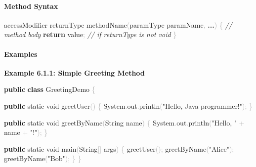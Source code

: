 \documentclass[
  justified,
  openright,
]{tufte-book}
\let\subsection\paragraph
\let\paragraph\paragraph
\newcommand{\KeywordTok}[1]{\textcolor{CodeKeyword}{\textbf{#1}}}  %
\newcommand{\StringTok}[1]{\textcolor{CodeString}{#1}}              %
\newcommand{\CommentTok}[1]{\textcolor{CodeComment}{\textit{#1}}}  %
\newcommand{\CodeFuncTok}[1]{\textcolor{CodeKeyword}{#1}}           %
\newcommand{\CodeTypeTok}[1]{\textcolor{CodeType}{#1}}              %
\newcommand{\OperatorTok}[1]{\textcolor{DarkGray}{#1}}              %
\newenvironment{Shaded}{%
  \begin{mdframed}[style=TufteCode]%
}{%
  \end{mdframed}%
}
\let\subsection\paragraph
\let\paragraph\paragraph
\begin{document}
\subsection{Method Syntax}\label{method-syntax}

\begin{Shaded}
\begin{Highlighting}[]
accessModifier returnType \CodeFuncTok{methodName}\OperatorTok{(}paramType paramName\OperatorTok{,} \KeywordTok{...}\OperatorTok{)} \OperatorTok{\{}
    \CommentTok{// method body}
    \KeywordTok{return} value\OperatorTok{;}  \CommentTok{// if returnType is not void}
\OperatorTok{\}}
\end{Highlighting}
\end{Shaded}

\subsection{Examples}\label{examples-26}

\textbf{Example 6.1.1: Simple Greeting Method}

\begin{Shaded}
\begin{Highlighting}[]
\KeywordTok{public} \KeywordTok{class} GreetingDemo \OperatorTok{\{}
 
    \KeywordTok{public} \CodeTypeTok{static} \CodeTypeTok{void} \CodeFuncTok{greetUser}\OperatorTok{()} \OperatorTok{\{}
        System\OperatorTok{.}\CodeFuncTok{out}\OperatorTok{.}\CodeFuncTok{println}\OperatorTok{(}\StringTok{"Hello, Java programmer!"}\OperatorTok{);}
    \OperatorTok{\}}
 
    \KeywordTok{public} \CodeTypeTok{static} \CodeTypeTok{void} \CodeFuncTok{greetByName}\OperatorTok{(}String name\OperatorTok{)} \OperatorTok{\{}
        System\OperatorTok{.}\CodeFuncTok{out}\OperatorTok{.}\CodeFuncTok{println}\OperatorTok{(}\StringTok{"Hello, "} \OperatorTok{+} name \OperatorTok{+} \StringTok{"!"}\OperatorTok{);}
    \OperatorTok{\}}
 
    \KeywordTok{public} \CodeTypeTok{static} \CodeTypeTok{void} \CodeFuncTok{main}\OperatorTok{(}String\OperatorTok{[]} args\OperatorTok{)} \OperatorTok{\{}
        \CodeFuncTok{greetUser}\OperatorTok{();}
        \CodeFuncTok{greetByName}\OperatorTok{(}\StringTok{"Alice"}\OperatorTok{);}
        \CodeFuncTok{greetByName}\OperatorTok{(}\StringTok{"Bob"}\OperatorTok{);}
    \OperatorTok{\}}
\OperatorTok{\}}
\end{Highlighting}
\end{Shaded}
\end{document}
